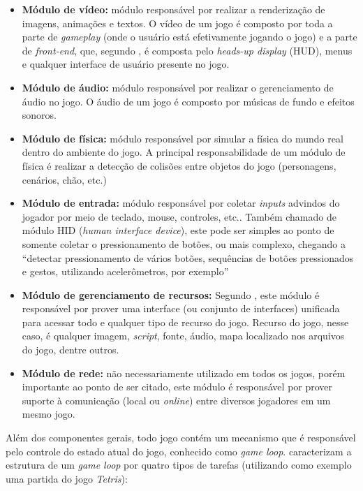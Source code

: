 \begin{itemize}
\item \textbf{Módulo de vídeo:} módulo responsável por realizar a renderização de imagens, animações e textos. O vídeo de um jogo é composto por toda a parte de \textit{gameplay} (onde o usuário está efetivamente jogando o jogo) e a parte de \textit{front-end}, que, segundo , é composta pelo \textit{heads-up display} (HUD), menus e qualquer interface de usuário presente no jogo.

\item \textbf{Módulo de áudio:} módulo responsável por realizar o gerenciamento de áudio no jogo. O áudio de um jogo é composto por músicas de fundo e efeitos sonoros.

\item \textbf{Módulo de física:} módulo responsável por simular a física do mundo real dentro do ambiente do jogo. A principal responsabilidade de um módulo de física é realizar a detecção de colisões entre objetos do jogo (personagens, cenários, chão, etc.)

\item \textbf{Módulo de entrada:} módulo responsável por coletar \textit{inputs} advindos do jogador por meio de teclado, mouse, controles, etc.. Também chamado de módulo HID (\textit{human interface device}), este pode ser simples ao ponto de somente coletar o pressionamento de botões, ou mais complexo, chegando a “detectar pressionamento de vários botões, sequências de botões pressionados e gestos, utilizando acelerômetros, por exemplo” \cite[p.~43]{gregory2014game}

\item \textbf{Módulo de gerenciamento de recursos:} Segundo , este módulo é responsável por prover uma interface (ou conjunto de interfaces) unificada para acessar todo e qualquer tipo de recurso do jogo. Recurso do jogo, nesse caso, é qualquer imagem, \textit{script}, fonte, áudio, mapa localizado nos arquivos do jogo, dentre outros.

\item \textbf{Módulo de rede:} não necessariamente utilizado em todos os jogos, porém importante ao ponto de ser citado, este módulo é responsável por prover suporte à comunicação (local ou \textit{online}) entre diversos jogadores em um mesmo jogo.
\end{itemize}


Além dos componentes gerais, todo jogo contém um mecanismo que é responsável pelo controle do estado atual do jogo, conhecido como \textit{game loop}.  caracterizam a estrutura de um \textit{game loop} por quatro tipos de tarefas (utilizando como exemplo uma partida do jogo \textit{Tetris}):

